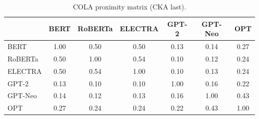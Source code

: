 \begin{table}[!ht]
\centering
\scriptsize
\setlength{\tabcolsep}{3pt}
\begin{tabular}{lcccccc}
\toprule
& \textbf{BERT} & \textbf{RoBERTa} & \textbf{ELECTRA} & \textbf{GPT-2} & \textbf{GPT-Neo} & \textbf{OPT} \\
\midrule
BERT & 1.00 & 0.50 & 0.50 & 0.13 & 0.14 & 0.27 \\
RoBERTa & 0.50 & 1.00 & 0.54 & 0.10 & 0.12 & 0.24 \\
ELECTRA & 0.50 & 0.54 & 1.00 & 0.10 & 0.13 & 0.24 \\
GPT-2 & 0.13 & 0.10 & 0.10 & 1.00 & 0.16 & 0.22 \\
GPT-Neo & 0.14 & 0.12 & 0.13 & 0.16 & 1.00 & 0.43 \\
OPT & 0.27 & 0.24 & 0.24 & 0.22 & 0.43 & 1.00 \\
\bottomrule
\end{tabular}
\caption{COLA proximity matrix (CKA last).}
\label{tab:proximity_cola}
\end{table}